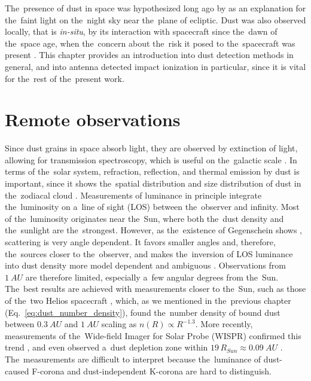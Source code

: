 The~presence of dust in space was hypothesized long ago by \citet{cassini1685} as an explanation for the~faint light on the~night sky near the~plane of ecliptic. Dust was also observed locally, that is \textit{in-situ}, by its interaction with spacecraft since the~dawn of the~space age, when the~concern about the~risk it posed to the~spacecraft was present \citep{whipple1958meteoritic}. This chapter provides an introduction into dust detection methods in general, and into antenna detected impact ionization in particular, since it is vital for the~rest of the~present work.

\section{Remote observations}

Since dust grains in space absorb light, they are observed by extinction of light, \citep{desert1990interstellar} allowing for transmission spectroscopy, which is useful on the~galactic scale \citep{mann2010interstellar}. In terms of the~solar system, refraction, reflection, and thermal emission by dust is important, since it shows the~spatial distribution and size distribution of dust in the~zodiacal cloud \citep{allen1946spectrum,hulst1947zodiacal,leinert1981zodiacal,stenborg2018characterization,stenborg2021psp}. Measurements of luminance in principle integrate the~luminosity on a~line of sight ({LOS}) between the~observer and infinity. Most of the~luminosity originates near the~Sun, where both the~dust density and the~sunlight are the~strongest. However, as the~existence of Gegenschein shows \citep{roosen1971gegenschein}, scattering is very angle dependent. It favors smaller angles and, therefore, the~sources closer to the~observer, and makes the~inversion of LOS luminance into dust density more model dependent and ambiguous \citep{mann2004dust,kneissel1991spatial}. Observations from $\SI{1}{AU}$ are therefore limited, especially a~few angular degrees from the~Sun. The~best results are achieved with measurements closer to the~Sun, such as those of the~two Helios spacecraft \citep{leinert1981zodiacal}, which, as we mentioned in the~previous chapter (Eq.~\ref{eq:dust_number_density}), found the~number density of bound dust between $\SI{0.3}{AU}$ and $\SI{1}{AU}$ scaling as $n(R) \propto R^{-1.3}$. More recently, measurements of the~Wide-field Imager for Solar Probe ({WISPR}) confirmed this trend \citep{stenborg2021psp}, and even observed a~dust depletion zone within $19 \, R_{Sun} \approx \SI{0.09}{AU}$ \citep{stenborg2022psp}. The~measurements are difficult to interpret because the~luminance of dust-caused F-corona and dust-independent K-corona are hard to distinguish. 

